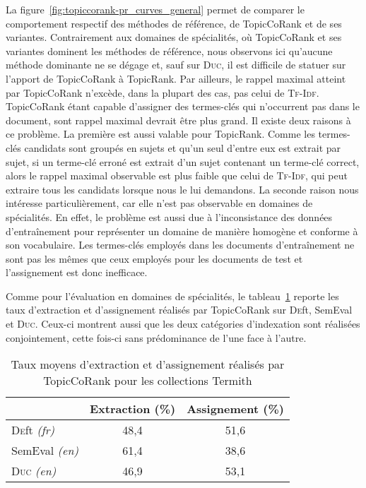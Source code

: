         La figure~\ref{fig:topiccorank-pr_curves_general} permet de comparer le
        comportement respectif des méthodes de référence, de TopicCoRank et de
        ses variantes. Contrairement aux domaines de spécialités, où TopicCoRank
        et ses variantes dominent les méthodes de référence, nous observons ici
        qu'aucune méthode dominante ne se dégage et, sauf sur \textsc{Duc}, il
        est difficile de statuer sur l'apport de TopicCoRank à TopicRank. Par
        ailleurs, le rappel maximal atteint par TopicCoRank n'excède, dans la
        plupart des cas, pas celui de \textsc{Tf-Idf}. TopicCoRank étant capable
        d'assigner des termes-clés qui n'occurrent pas dans le document, sont
        rappel maximal devrait être plus grand. Il existe deux raisons à ce
        problème. La première est aussi valable pour TopicRank. Comme les
        termes-clés candidats sont groupés en sujets et qu'un seul d'entre eux
        est extrait par sujet, si un terme-clé erroné est extrait d'un sujet
        contenant un terme-clé correct, alors le rappel maximal observable est
        plus faible que celui de \textsc{Tf-Idf}, qui peut extraire tous les
        candidats lorsque nous le lui demandons. La seconde raison nous
        intéresse particulièrement, car elle n'est pas observable en domaines de
        spécialités. En effet, le problème est aussi due à l'inconsistance des
        données d'entraînement pour représenter un \og{}domaine\fg{} de manière
        homogène et conforme à son vocabulaire. Les termes-clés employés dans
        les documents d'entraînement ne sont pas les mêmes que ceux employés
        pour les documents de test et l'assignement est donc inefficace.
        

        Comme pour l'évaluation en domaines de spécialités, le
        tableau~\ref{tab:assignment_ratio_general} reporte les taux d'extraction
        et d'assignement réalisés par TopicCoRank sur \textsc{De}ft, SemEval et
        \textsc{Duc}. Ceux-ci montrent aussi que les deux catégories
        d'indexation sont réalisées conjointement, cette fois-ci sans
        prédominance de l'une face à l'autre.
        \begin{table}[h]
          \centering
          \begin{tabular}{l|c|c}
              \toprule
              & Extraction (\%) & Assignement (\%)\\
              \hline
              \textsc{De}ft \textit{(fr)} & 48,4 & 51,6\\
              SemEval \textit{(en)} & 61,4 & 38,6\\
              \textsc{Duc} \textit{(en)} & 46,9 & 53,1\\
              \bottomrule
          \end{tabular}
          \caption{Taux moyens d'extraction et d'assignement réalisés par
                   TopicCoRank pour les collections Termith
                   \label{tab:assignment_ratio_general}}
        \end{table}

